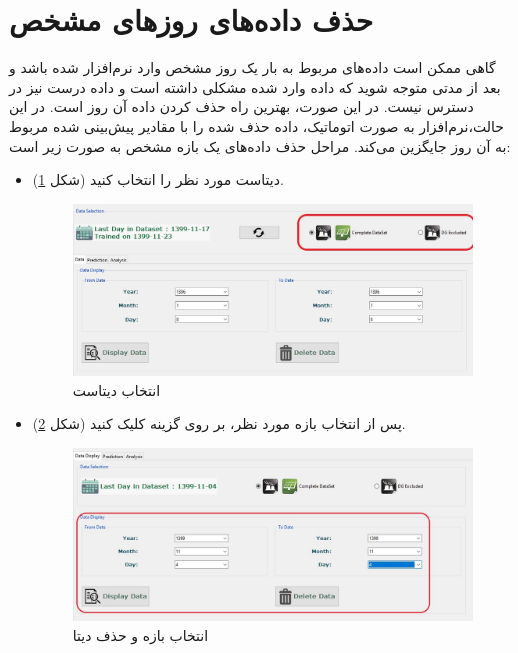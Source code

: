 \documentclass[a4paper,20pt,dvipsnames, usenames]{extbook}
\begin{document}
\section{حذف داده‌های روزهای مشخص}
گاهی ممکن است داده‌های مربوط به بار یک روز مشخص وارد نرم‌افزار شده باشد و بعد از مدتی متوجه شوید که داده وارد شده مشکلی داشته است و داده درست نیز در دسترس نیست. در این صورت، بهترین راه حذف کردن داده آن روز است. در این حالت،‌نرم‌افزار به صورت اتوماتیک، داده حذف شده را با مقادیر پیش‌بینی شده مربوط به آن روز جایگزین می‌کند. مراحل حذف داده‌های یک بازه مشخص به صورت زیر است:
\begin{itemize}
	\item
	دیتاست مورد نظر را انتخاب کنید (شکل	
	\ref{fig5-1}).
	\begin{figure}[!h]
		\centering
		\includegraphics[width = \textwidth]{fig1}
		\caption{انتخاب دیتاست}
		\label{fig5-1}
	\end{figure}
	\item
	پس از انتخاب بازه مورد نظر، بر روی گزینه 
	کلیک کنید (شکل
	\ref{fig28}).
	
	\begin{figure}[!h]
		\centering
		\includegraphics[width = \textwidth]{fig26}
		\caption{انتخاب بازه و حذف دیتا}
		\label{fig28}
	\end{figure}


\end{itemize}
\end{document}
